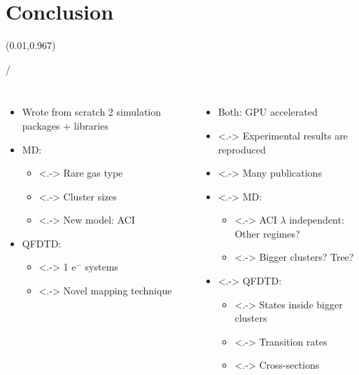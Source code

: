 \documentclass{beamer}
\makeatletter
\newcommand{\framenumber}{
\begin{textblock}{0}(0.01,0.967)
\begin{scriptsize}
{\color{gray}\insertframenumber/\inserttotalframenumber}
\end{scriptsize}
\end{textblock}
}
\makeatother
\begin{document}
\section{Conclusion}
\begin{frame}{}\framenumber

\begin{columns}[t]

    \begin{itemize}
    \item<+-> Wrote from scratch 2 simulation packages + libraries
    \item<+-> MD:
        \begin{itemize}
        \item<.-> Rare gas type
        \item<.-> Cluster sizes
        \item<.-> New model: ACI
        \end{itemize}
    \item<+-> QFDTD:
        \begin{itemize}
        \item<.-> 1 e$^{-}$ systems
        \item<.-> Novel mapping technique
        \end{itemize}
    \end{itemize}

    \begin{itemize}
    \item<+-> Both: GPU accelerated
    \item<.-> Experimental results are reproduced
    \item<.-> Many publications
    \item<.-> MD:
        \begin{itemize}
        \item<.-> ACI $\lambda$ independent: Other regimes?
        \item<.-> Bigger clusters? Tree?
        \end{itemize}
    \item<.-> QFDTD:
        \begin{itemize}
        \item<.-> States inside bigger clusters
        \item<.-> Transition rates
        \item<.-> Cross-sections
        \end{itemize}
    \end{itemize}

\end{columns}
\end{frame}
\end{document}
